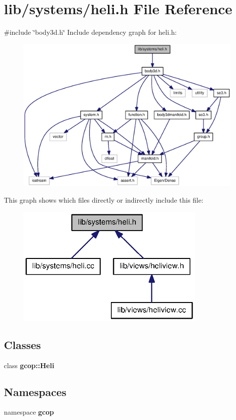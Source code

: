 \section{lib/systems/heli.h \-File \-Reference}
\label{heli_8h}
{\ttfamily \#include \char`\"{}body3d.\-h\char`\"{}}\*
\-Include dependency graph for heli.\-h\-:\nopagebreak
\begin{figure}[H]
\begin{center}
\leavevmode
\includegraphics[width=350pt]{heli_8h__incl}
\end{center}
\end{figure}
\-This graph shows which files directly or indirectly include this file\-:\nopagebreak
\begin{figure}[H]
\begin{center}
\leavevmode
\includegraphics[width=263pt]{heli_8h__dep__incl}
\end{center}
\end{figure}
\subsection*{\-Classes}
\begin{DoxyCompactItemize}
\item 
class {\bf gcop\-::\-Heli}
\end{DoxyCompactItemize}
\subsection*{\-Namespaces}
\begin{DoxyCompactItemize}
\item 
namespace {\bf gcop}
\end{DoxyCompactItemize}
